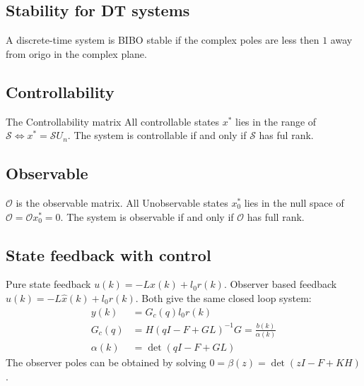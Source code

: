 \begin{multicols}{2}
\subsection{Stability for DT systems}
A discrete-time system is BIBO stable if the complex poles are less then $1$ away from origo in the complex plane.


\subsection{Controllability}
The Controllability matrix 
All controllable states $x^*$ lies in the range of $\mathcal{S} \Leftrightarrow x^* = \mathcal{S}U_n$.
The system is controllable if and only if $\mathcal{S}$ has ful rank.


\subsection{Observable}

$\mathcal{O}$ is the observable matrix.
All Unobservable states $x^*_0$ lies in the null space of $\mathcal{O} = \mathcal{O}x^*_0 = 0$.
The system is observable if and only if $\mathcal{O}$ has full rank.



\subsection{State feedback with control}
Pure state feedback $u(k) = -Lx(k) + l_0r(k)$.
Observer based feedback $u(k) = -L\hat{x}(k) + l_0r(k)$.
Both give the same closed loop system:
\begin{align*}
    y(k) &= G_c(q)l_0r(k) \\
    G_c(q) &= H(qI-F+GL)^{-1}G = \frac{b(k)}{\alpha(k)} \\
    \alpha(k) &= \det(qI-F+GL)
\end{align*}
The observer poles can be obtained by solving $0=\beta(z)=\det(zI-F+KH)$.


\end{multicols}
